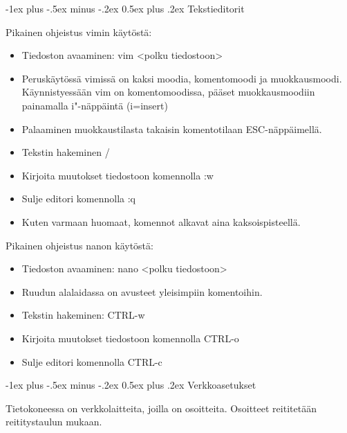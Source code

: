 \documentclass[10pt,portrait,a4]{article}
\makeatletter
\renewcommand{\section}{\@startsection{section}{1}{0mm}%
                                {-1ex plus -.5ex minus -.2ex}%
                                {0.5ex plus .2ex}%
                                {\normalfont\large\bfseries}}
\makeatother
\begin{document}
\begin{multicols}{2}
\section{Tekstieditorit}

Pikainen ohjeistus vimin käytöstä:
\begin{itemize}
\item Tiedoston avaaminen: vim \textless polku tiedostoon\textgreater
\item Peruskäytössä vimissä on kaksi moodia, komentomoodi ja muokkausmoodi.
 Käynnistyessään vim on komentomoodissa, pääset muokkausmoodiin painamalla
i"-näppäintä (i=insert)
\item Palaaminen muokkaustilasta takaisin komentotilaan ESC-näppäimellä.
\item Tekstin hakeminen /
\item Kirjoita muutokset tiedostoon komennolla :w
\item Sulje editori komennolla :q
\item Kuten varmaan huomaat, komennot alkavat aina kaksoispisteellä.
\end{itemize}

Pikainen ohjeistus nanon käytöstä:
\begin{itemize}
\item Tiedoston avaaminen: nano \textless polku tiedostoon\textgreater
\item Ruudun alalaidassa on avusteet yleisimpiin komentoihin.
\item Tekstin hakeminen: CTRL-w
\item Kirjoita muutokset tiedostoon komennolla CTRL-o
\item Sulje editori komennolla CTRL-c
\end{itemize}

\section{Verkkoasetukset}

Tietokoneessa on verkkolaitteita, joilla on osoitteita.  Osoitteet
reititetään reititystaulun mukaan.


\end{multicols}
\end{document}
